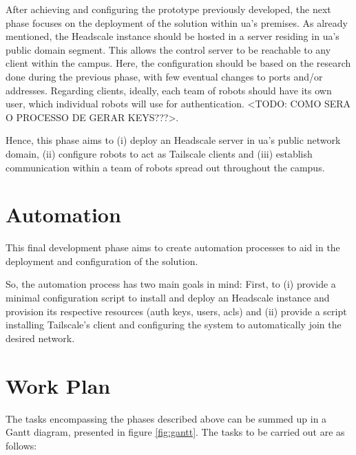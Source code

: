 \documentclass[11pt,twoside,a4paper]{report}
\begin{document}
After achieving and configuring the prototype previously developed, the next phase focuses on the deployment of the solution within \ac{ua}'s premises. As already mentioned, the Headscale instance should be hosted in a server residing in \ac{ua}'s public domain segment. This allows the control server to be reachable to any client within the campus. Here, the configuration should be based on the research done during the previous phase, with few eventual changes to ports and/or addresses. Regarding clients, ideally, each team of robots should have its own user, which individual robots will use for authentication. <TODO: COMO SERA O PROCESSO DE GERAR KEYS???>.

Hence, this phase aims to (i) deploy an Headscale server in \ac{ua}'s public network domain, (ii) configure robots to act as Tailscale clients and (iii) establish communication within a team of robots spread out throughout the campus.


\section{Automation}
\label{sec:automethod}

This final development phase aims to create automation processes to aid in the deployment and configuration of the solution.

So, the automation process has two main goals in mind: First, to (i) provide a minimal configuration script to install and deploy an Headscale instance and provision its respective resources (auth keys, users, \acp{acl}) and (ii) provide a script installing Tailscale's client and configuring the system to automatically join the desired network.

\section{Work Plan}

The tasks encompassing the phases described above can be summed up in a Gantt diagram, presented in figure \ref{fig:gantt}. The tasks to be carried out are as follows:
\end{document}
